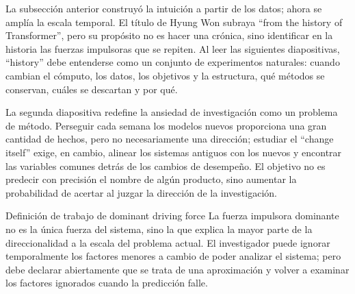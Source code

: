La subsección anterior construyó la intuición a partir de los datos; ahora se amplía la escala temporal. El título de Hyung Won subraya ``from the history of Transformer'', pero su propósito no es hacer una crónica, sino identificar en la historia las fuerzas impulsoras que se repiten. Al leer las siguientes diapositivas, ``history'' debe entenderse como un conjunto de experimentos naturales: cuando cambian el cómputo, los datos, los objetivos y la estructura, qué métodos se conservan, cuáles se descartan y por qué.



La segunda diapositiva redefine la ansiedad de investigación como un problema de método. Perseguir cada semana los modelos nuevos proporciona una gran cantidad de hechos, pero no necesariamente una dirección; estudiar el ``change itself'' exige, en cambio, alinear los sistemas antiguos con los nuevos y encontrar las variables comunes detrás de los cambios de desempeño. El objetivo no es predecir con precisión el nombre de algún producto, sino aumentar la probabilidad de acertar al juzgar la dirección de la investigación.



\begin{importantbox}{Definición de trabajo de dominant driving force}
La fuerza impulsora dominante no es la única fuerza del sistema, sino la que explica la mayor parte de la direccionalidad a la escala del problema actual. El investigador puede ignorar temporalmente los factores menores a cambio de poder analizar el sistema; pero debe declarar abiertamente que se trata de una aproximación y volver a examinar los factores ignorados cuando la predicción falle.
\end{importantbox}

